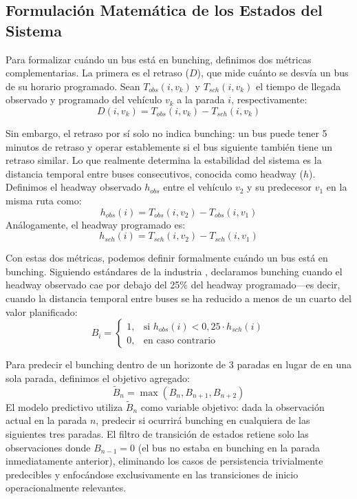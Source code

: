 \documentclass[fleqn,10pt,lineno]{wlpeerj}
\begin{document}
\subsection{Formulaci\'on Matem\'atica de los Estados del Sistema}

Para formalizar cu\'ando un bus est\'a en bunching, definimos dos m\'etricas complementarias. La primera es el retraso ($D$), que mide cu\'anto se desv\'ia un bus de su horario programado. Sean $T_{obs}(i, v_k)$ y $T_{sch}(i, v_k)$ el tiempo de llegada observado y programado del veh\'iculo $v_k$ a la parada $i$, respectivamente:
\begin{equation}
  D(i, v_k) = T_{obs}(i, v_k) - T_{sch}(i, v_k)
\end{equation}

Sin embargo, el retraso por s\'i solo no indica bunching: un bus puede tener 5 minutos de retraso y operar establemente si el bus siguiente tambi\'en tiene un retraso similar. Lo que realmente determina la estabilidad del sistema es la distancia temporal entre buses consecutivos, conocida como headway ($h$). Definimos el headway observado $h_{obs}$ entre el veh\'iculo $v_2$ y su predecesor $v_1$ en la misma ruta como:
\begin{equation}
  h_{obs}(i) = T_{obs}(i, v_2) - T_{obs}(i, v_1)
\end{equation}
An\'alogamente, el headway programado es:
\begin{equation}
  h_{sch}(i) = T_{sch}(i, v_2) - T_{sch}(i, v_1)
\end{equation}

Con estas dos m\'etricas, podemos definir formalmente cu\'ando un bus est\'a en bunching. Siguiendo est\'andares de la industria \citep{1,10}, declaramos bunching cuando el headway observado cae por debajo del 25\% del headway programado---es decir, cuando la distancia temporal entre buses se ha reducido a menos de un cuarto del valor planificado:
\begin{equation}
  B_i =
  \begin{cases}
    1, & \text{si } h_{obs}(i) < 0,25 \cdot h_{sch}(i) \\
    0, & \text{en caso contrario}
  \end{cases}
\end{equation}

Para predecir el bunching dentro de un horizonte de 3 paradas en lugar de en una sola parada, definimos el objetivo agregado:
\begin{equation}
  \tilde{B}_n = \max(B_n, B_{n+1}, B_{n+2})
\end{equation}
El modelo predictivo utiliza $\tilde{B}_n$ como variable objetivo: dada la observaci\'on actual en la parada $n$, predecir si ocurrir\'a bunching en cualquiera de las siguientes tres paradas. El filtro de transici\'on de estados retiene solo las observaciones donde $B_{n-1}=0$ (el bus no estaba en bunching en la parada inmediatamente anterior), eliminando los casos de persistencia trivialmente predecibles y enfoc\'andose exclusivamente en las transiciones de inicio operacionalmente relevantes.
\end{document}
